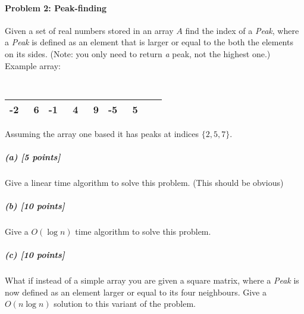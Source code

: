 \documentclass[11pt]{article}
\begin{document}
\paragraph{Problem 2: Peak-finding}
Given a set of real numbers stored in an array $A$ find the index of a {\em Peak}, where a {\em Peak} is defined as an
element that is larger or equal to the both the elements on its sides. (Note: you only need to return {\em a} peak, not
the highest one.)\\

Example array:
                {\tt
                \begin{tabular}{|*{9}{r|}}
                    \hline
                    -2 & \ 6 & -1 & \ 4 & \ 9 & -5 & \ 5  \\
                    \hline
                \end{tabular}
                }

Assuming the array one based it has peaks at indices $\{2,5,7 \}$.

\subparagraph{(a) [5 points]}
Give a linear time algorithm to solve this problem. (This should be obvious)
\subparagraph{(b) [10 points]}
Give a $O(\log n)$ time algorithm to solve this problem.
\subparagraph{(c) [10 points]}
What if instead of a simple array you are given a square matrix, where a {\em Peak} is now defined as an element larger
or equal to its four neighbours. Give a $O(n \log n)$ solution to this variant of the problem.
\end{document}
